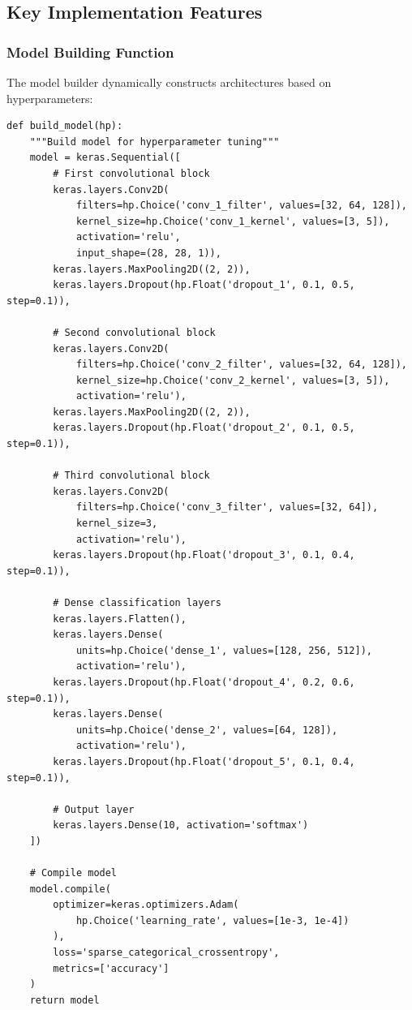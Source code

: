 \documentclass[12pt,a4paper]{article}
\begin{document}
\subsection{Key Implementation Features}

\subsubsection{Model Building Function}
The model builder dynamically constructs architectures based on hyperparameters:

\begin{lstlisting}[caption={Dynamic Model Builder}]
def build_model(hp):
    """Build model for hyperparameter tuning"""
    model = keras.Sequential([
        # First convolutional block
        keras.layers.Conv2D(
            filters=hp.Choice('conv_1_filter', values=[32, 64, 128]),
            kernel_size=hp.Choice('conv_1_kernel', values=[3, 5]),
            activation='relu',
            input_shape=(28, 28, 1)),
        keras.layers.MaxPooling2D((2, 2)),
        keras.layers.Dropout(hp.Float('dropout_1', 0.1, 0.5, step=0.1)),
        
        # Second convolutional block
        keras.layers.Conv2D(
            filters=hp.Choice('conv_2_filter', values=[32, 64, 128]),
            kernel_size=hp.Choice('conv_2_kernel', values=[3, 5]),
            activation='relu'),
        keras.layers.MaxPooling2D((2, 2)),
        keras.layers.Dropout(hp.Float('dropout_2', 0.1, 0.5, step=0.1)),
        
        # Third convolutional block
        keras.layers.Conv2D(
            filters=hp.Choice('conv_3_filter', values=[32, 64]),
            kernel_size=3,
            activation='relu'),
        keras.layers.Dropout(hp.Float('dropout_3', 0.1, 0.4, step=0.1)),
        
        # Dense classification layers
        keras.layers.Flatten(),
        keras.layers.Dense(
            units=hp.Choice('dense_1', values=[128, 256, 512]),
            activation='relu'),
        keras.layers.Dropout(hp.Float('dropout_4', 0.2, 0.6, step=0.1)),
        keras.layers.Dense(
            units=hp.Choice('dense_2', values=[64, 128]),
            activation='relu'),
        keras.layers.Dropout(hp.Float('dropout_5', 0.1, 0.4, step=0.1)),
        
        # Output layer
        keras.layers.Dense(10, activation='softmax')
    ])
    
    # Compile model
    model.compile(
        optimizer=keras.optimizers.Adam(
            hp.Choice('learning_rate', values=[1e-3, 1e-4])
        ),
        loss='sparse_categorical_crossentropy',
        metrics=['accuracy']
    )
    return model
\end{lstlisting}
\end{document}
